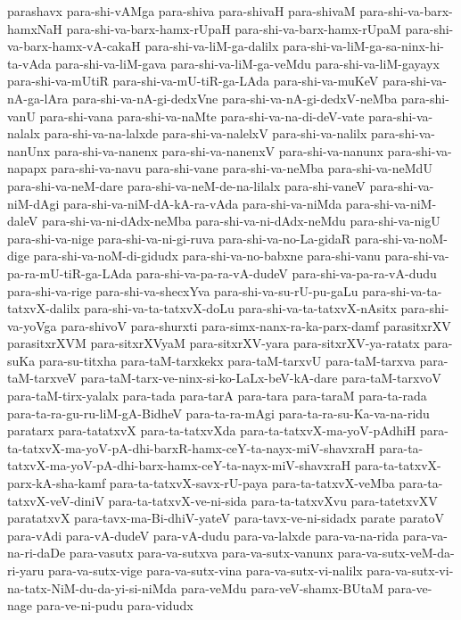 {parashavx
para-shi-vAMga
para-shiva
para-shivaH
para-shivaM
para-shi-va-barx-hamxNaH
para-shi-va-barx-hamx-rUpaH
para-shi-va-barx-hamx-rUpaM
para-shi-va-barx-hamx-vA-cakaH
para-shi-va-liM-ga-dalilx
para-shi-va-liM-ga-sa-ninx-hi-ta-vAda
para-shi-va-liM-gava
para-shi-va-liM-ga-veMdu
para-shi-va-liM-gayayx
para-shi-va-mUtiR
para-shi-va-mU-tiR-ga-LAda
para-shi-va-muKeV
para-shi-va-nA-ga-lAra
para-shi-va-nA-gi-dedxVne
para-shi-va-nA-gi-dedxV-neMba
para-shi-vanU
para-shi-vana
para-shi-va-naMte
para-shi-va-na-di-deV-vate
para-shi-va-nalalx
para-shi-va-na-lalxde
para-shi-va-nalelxV
para-shi-va-nalilx
para-shi-va-nanUnx
para-shi-va-nanenx
para-shi-va-nanenxV
para-shi-va-nanunx
para-shi-va-napapx
para-shi-va-navu
para-shi-vane
para-shi-va-neMba
para-shi-va-neMdU
para-shi-va-neM-dare
para-shi-va-neM-de-na-lilalx
para-shi-vaneV
para-shi-va-niM-dAgi
para-shi-va-niM-dA-kA-ra-vAda
para-shi-va-niMda
para-shi-va-niM-daleV
para-shi-va-ni-dAdx-neMba
para-shi-va-ni-dAdx-neMdu
para-shi-va-nigU
para-shi-va-nige
para-shi-va-ni-gi-ruva
para-shi-va-no-La-gidaR
para-shi-va-noM-dige
para-shi-va-noM-di-gidudx
para-shi-va-no-babxne
para-shi-vanu
para-shi-va-pa-ra-mU-tiR-ga-LAda
para-shi-va-pa-ra-vA-dudeV
para-shi-va-pa-ra-vA-dudu
para-shi-va-rige
para-shi-va-shecxYva
para-shi-va-su-rU-pu-gaLu
para-shi-va-ta-tatxvX-dalilx
para-shi-va-ta-tatxvX-doLu
para-shi-va-ta-tatxvX-nAsitx
para-shi-va-yoVga
para-shivoV
para-shurxti
para-simx-nanx-ra-ka-parx-damf
parasitxrXV
parasitxrXVM
para-sitxrXVyaM
para-sitxrXV-yara
para-sitxrXV-ya-ratatx
para-suKa
para-su-titxha
para-taM-tarxkekx
para-taM-tarxvU
para-taM-tarxva
para-taM-tarxveV
para-taM-tarx-ve-ninx-si-ko-LaLx-beV-kA-dare
para-taM-tarxvoV
para-taM-tirx-yalalx
para-tada
para-tarA
para-tara
para-taraM
para-ta-rada
para-ta-ra-gu-ru-liM-gA-BidheV
para-ta-ra-mAgi
para-ta-ra-su-Ka-va-na-ridu
paratarx
para-tatatxvX
para-ta-tatxvXda
para-ta-tatxvX-ma-yoV-pAdhiH
para-ta-tatxvX-ma-yoV-pA-dhi-barxR-hamx-ceY-ta-nayx-miV-shavxraH
para-ta-tatxvX-ma-yoV-pA-dhi-barx-hamx-ceY-ta-nayx-miV-shavxraH
para-ta-tatxvX-parx-kA-sha-kamf
para-ta-tatxvX-savx-rU-paya
para-ta-tatxvX-veMba
para-ta-tatxvX-veV-diniV
para-ta-tatxvX-ve-ni-sida
para-ta-tatxvXvu
para-tatetxvXV
paratatxvX
para-tavx-ma-Bi-dhiV-yateV
para-tavx-ve-ni-sidadx
parate
paratoV
para-vAdi
para-vA-dudeV
para-vA-dudu
para-va-lalxde
para-va-na-rida
para-va-na-ri-daDe
para-vasutx
para-va-sutxva
para-va-sutx-vanunx
para-va-sutx-veM-da-ri-yaru
para-va-sutx-vige
para-va-sutx-vina
para-va-sutx-vi-nalilx
para-va-sutx-vi-na-tatx-NiM-du-da-yi-si-niMda
para-veMdu
para-veV-shamx-BUtaM
para-ve-nage
para-ve-ni-pudu
para-vidudx
}
